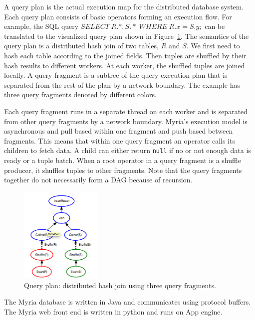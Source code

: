 \documentclass[11pt]{scrartcl}
\begin{document}
A query plan is the actual execution map for the distributed database system.  Each query plan consists of basic operators forming an execution flow. For example, the SQL query $SELECT \; R.*, S.*  \; WHERE \; R.x=S.y ;$ can be translated to the visualized query plan shown in Figure~\ref{fig:query_plan}. The semantics of the query plan is a distributed hash join of two tables, $R$ and $S$. We first need to hash each table according to the joined fields. Then tuples are shuffled by their hash results to different workers. At each worker, the shuffled tuples are joined locally. A query fragment is a subtree of the query execution plan that is separated from the rest of the plan by a network boundary. The example has three query fragments denoted by different colors.

Each query fragment runs in a separate thread on each worker and is separated from other query fragments by a network boundary. Myria's execution model is asynchronous and pull based within one fragment and push based between fragments. This means that within one query fragment an operator calls its children to fetch data. A child can either return \texttt{null} if no or not enough data is ready or a tuple batch. When a root operator in a query fragment is a shuffle producer, it shuffles tuples to other fragments. Note that the query fragments together do not necessarily form a DAG because of recursion.

\begin{figure}
 \begin{center}
     \includegraphics[width=0.35\textwidth]{partition_join.png}
   \end{center}
  \caption{Query plan: distributed hash join using three query fragments.}
  \label{fig:query_plan}
\end{figure}

The Myria database is written in Java and communicates using protocol buffers. The Myria web front end is written in python and runs on App engine.
\end{document}
